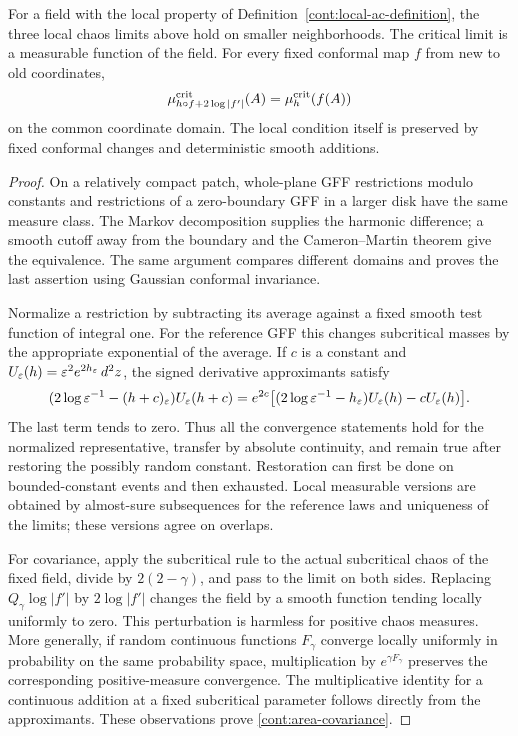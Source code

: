 \begin{lemma}\label{cont:chaos-transfer}
For a field with the local property of
Definition~\ref{cont:local-ac-definition}, the three local chaos limits above
hold on smaller neighborhoods.  The critical limit is a measurable function
of the field.  For every fixed conformal map $f$ from new to old coordinates,
\begin{equation}\label{cont:area-covariance}
 \mu_{h\circ f+2\log|f'|}^{\rm crit}(A)
       =\mu_h^{\rm crit}(f(A))
\end{equation}
on the common coordinate domain.  The local condition itself is preserved by
fixed conformal changes and deterministic smooth additions.
\end{lemma}

\begin{proof}
On a relatively compact patch, whole-plane GFF restrictions modulo constants
and restrictions of a zero-boundary GFF in a larger disk have the same measure
class.  The Markov decomposition supplies the harmonic difference; a smooth
cutoff away from the boundary and the Cameron--Martin theorem give the
equivalence.  The same argument compares different domains and proves the
last assertion using Gaussian conformal invariance.

Normalize a restriction by subtracting its average against a fixed smooth
test function of integral one.  For the reference GFF this changes
subcritical masses by the appropriate exponential of the average.  If $c$ is
a constant and $U_\varepsilon(h)=\varepsilon^2e^{2h_\varepsilon}\,d^2z$, the signed derivative
approximants satisfy
\[
 (2\log\varepsilon^{-1}-(h+c)_\varepsilon)U_\varepsilon(h+c)
 =e^{2c}\bigl[(2\log\varepsilon^{-1}-h_\varepsilon)U_\varepsilon(h)-cU_\varepsilon(h)\bigr].
\]
The last term tends to zero.  Thus all the convergence statements hold for
the normalized representative, transfer by absolute continuity, and remain
true after restoring the possibly random constant.  Restoration can first
be done on bounded-constant events and then exhausted.  Local measurable
versions are obtained by almost-sure subsequences for the reference laws and
uniqueness of the limits; these versions agree on overlaps.

For covariance, apply the subcritical rule to the actual subcritical chaos
of the fixed field, divide by $2(2-\gamma)$, and pass to the limit on both
sides.  Replacing $Q_\gamma\log|f'|$ by $2\log|f'|$ changes the field by a
smooth function tending locally uniformly to zero.  This perturbation is
harmless for positive chaos measures.  More generally, if random continuous
functions $F_\gamma$ converge locally uniformly in probability on the same
probability space, multiplication by $e^{\gamma F_\gamma}$ preserves the
corresponding positive-measure convergence.  The multiplicative identity for
a continuous addition at a fixed subcritical parameter follows directly
from the approximants.  These observations prove
\eqref{cont:area-covariance}.
\end{proof}

